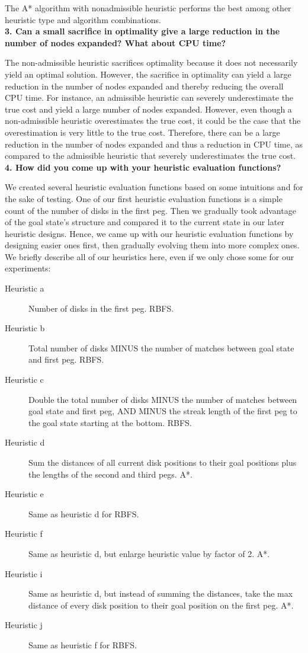 The A* algorithm with nonadmissible heuristic performs the best among other heuristic type and algorithm combinations.\\

\textbf{3. Can a small sacrifice in optimality give a large reduction in the number of nodes expanded? What about CPU time?}

The non-admissible heuristic sacrifices optimality because it does not necessarily yield an optimal solution. However, the sacrifice in optimality can yield a large reduction in the number of nodes expanded and thereby reducing the overall CPU time. For instance, an admissible heuristic can severely underestimate the true cost and yield a large number of nodes expanded. However, even though a non-admissible heuristic overestimates the true cost, it could be the case that the overestimation is very little to the true cost. Therefore, there can be a large reduction in the number of nodes expanded and thus a reduction in CPU time, as compared to the admissible heuristic that severely underestimates the true cost.\\

\textbf{4. How did you come up with your heuristic evaluation functions?}

We created several heuristic evaluation functions based on some intuitions and for the sake of testing. One of our first heuristic evaluation functions is a simple count of the number of disks in the first peg. Then we gradually took advantage of the goal state's structure and compared it to the current state in our later heuristic designs. Hence, we came up with our heuristic evaluation functions by designing easier ones first, then gradually evolving them into more complex ones. We briefly describe all of our heuristics here, even if we only chose some for our experiments:

\begin{description}
	\item[Heuristic a] Number of disks in the first peg. RBFS.
	\item[Heuristic b] Total number of disks MINUS the number of matches between goal state and first peg. RBFS.
	\item[Heuristic c] Double the total number of disks MINUS the number of matches between goal state and first peg, AND MINUS the streak length of the first peg to the goal state starting at the bottom. RBFS.
	\item[Heuristic d] Sum the distances of all current disk positions to their goal positions plus the lengths of the second and third pegs. A*.
	\item[Heuristic e] Same as heuristic d for RBFS.
	\item[Heuristic f] Same as heuristic d, but enlarge heuristic value by factor of 2. A*. 
	\item[Heuristic i] Same as heuristic d, but instead of summing the distances, take the max distance of every disk position to their goal position on the first peg. A*.
	\item[Heuristic j] Same as heuristic f for RBFS.
\end{description}

